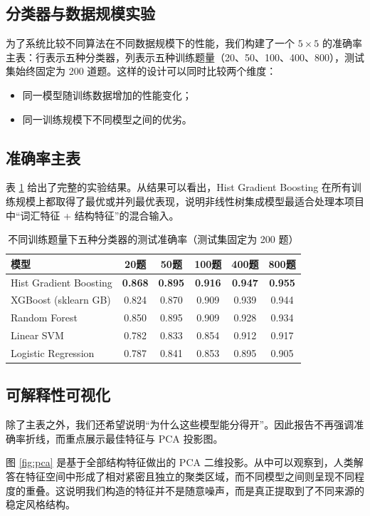 \documentclass[11pt, a4paper]{ctexart}
\begin{document}
\subsection{分类器与数据规模实验}
为了系统比较不同算法在不同数据规模下的性能，我们构建了一个 $5 \times 5$ 的准确率主表：行表示五种分类器，列表示五种训练题量（20、50、100、400、800），测试集始终固定为 200 道题。这样的设计可以同时比较两个维度：
\begin{itemize}
    \item 同一模型随训练数据增加的性能变化；
    \item 同一训练规模下不同模型之间的优劣。
\end{itemize}

\subsection{准确率主表}
表 \ref{tab:results} 给出了完整的实验结果。从结果可以看出，Hist Gradient Boosting 在所有训练规模上都取得了最优或并列最优表现，说明非线性树集成模型最适合处理本项目中“词汇特征 + 结构特征”的混合输入。

\begin{table}[H]
\centering
\caption{不同训练题量下五种分类器的测试准确率（测试集固定为 200 题）}
\label{tab:results}
\begin{tabular}{lccccc}
\toprule
\textbf{模型} & \textbf{20题} & \textbf{50题} & \textbf{100题} & \textbf{400题} & \textbf{800题} \\
\midrule
Hist Gradient Boosting & \textbf{0.868} & \textbf{0.895} & \textbf{0.916} & \textbf{0.947} & \textbf{0.955} \\
XGBoost (sklearn GB) & 0.824 & 0.870 & 0.909 & 0.939 & 0.944 \\
Random Forest & 0.850 & 0.895 & 0.909 & 0.928 & 0.934 \\
Linear SVM & 0.782 & 0.833 & 0.854 & 0.912 & 0.917 \\
Logistic Regression & 0.787 & 0.841 & 0.853 & 0.895 & 0.905 \\
\bottomrule
\end{tabular}
\end{table}

\subsection{可解释性可视化}
除了主表之外，我们还希望说明“为什么这些模型能分得开”。因此报告不再强调准确率折线，而重点展示最佳特征与 PCA 投影图。

图 \ref{fig:pca} 是基于全部结构特征做出的 PCA 二维投影。从中可以观察到，人类解答在特征空间中形成了相对紧密且独立的聚类区域，而不同模型之间则呈现不同程度的重叠。这说明我们构造的特征并不是随意噪声，而是真正提取到了不同来源的稳定风格结构。
\end{document}
